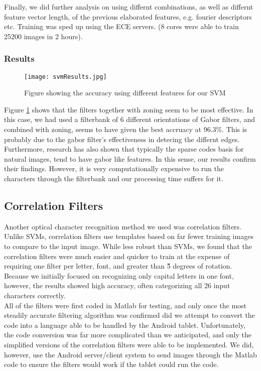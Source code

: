 Finally, we did further analysis on using differnt combinations, as well as differnt feature vector length, 
of the previous elaborated features, e.g. fourier descriptors etc. 
Training was sped up using the ECE servers. (8 cores were able to train 25200 images in 2 hours).

\subsubsection{Results}
\begin{figure}[h]
		\texttt{[image: svmResults.jpg]}\\
		\caption{Figure showing the accuracy using different features for our SVM}
		\label{fig:svmresults}
\end{figure}
Figure \ref{fig:svmresults} shows that the filters together with zoning seem to be most effective.
In this case, we had used a filterbank of 6 different orientations of Gabor filters,
and combined with zoning, seems to have given the best accruacy at 96.3\%. This is probably due
to the gabor filter's effectiveness in detecing the differnt edges. Furthermore, research has also
shown that typically the sparse codes basis for natural images, tend to have gabor like features.
In this sense, our results confirm their findings. However, it is very computationally expensive
to run the characters through the filterbank and our processing time suffers for it.


\subsection{Correlation Filters}
Another optical character recognition method we used was correlation filters. 
Unlike SVMs, correlation filters use templates based on far fewer training 
images to compare to the input image. While less robust than SVMs, we found 
that the correlation filters were much easier and quicker to train at the 
expense of requiring one filter per letter, font, and greater than \~5 degrees 
of rotation. Because we initially focused on recognizing only capital letters 
in one font, however, the results showed high accuracy, often categorizing all 
26 input characters correctly.\\
All of the filters were first coded in Matlab for testing, and only once the most 
steadily accurate filtering algorithm was confirmed did we attempt to convert the 
code into a language able to be handled by the Android tablet. Unfortunately, the 
code conversion was far more complicated than we anticipated, and only the 
simplified versions of the correlation filters were able to be implemented. We did, 
however, use the Android server/client system to send images through the Matlab 
code to ensure the filters would work if the tablet could run the code.

